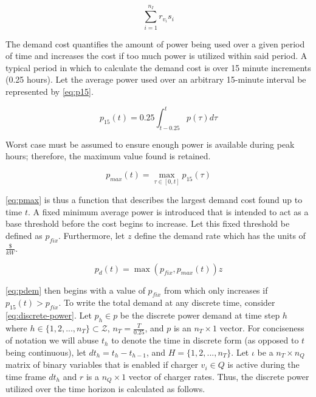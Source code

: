 \documentclass[11pt,a4paper,final]{article}
\newcommand{\Qset}{Q}                       %
\newcommand{\Hset}{H}                       %
\begin{document}
\begin{equation}
\label{eq:consumption-cost}
  \sum_{i=1}^{n_I} r_{v_i}s_i
\end{equation}

The demand cost quantifies the amount of power being used over a given period of time and increases the cost if too much
power is utilized within said period. A typical period in which to calculate the demand cost is over 15 minute
increments (0.25 hours). Let the average power used over an arbitrary 15-minute interval be represented by \ref{eq:p15}.

\begin{equation}
\label{eq:p15}
p_{15}(t) = 0.25 \int_{t-0.25}^{t} p(\tau) d\tau
\end{equation}

Worst case must be assumed to ensure enough power is available during peak hours; therefore, the maximum value found is
retained.

\begin{equation}
\label{eq:pmax}
p_{max}(t) = \max\limits_{\tau \in [0,t]}p_{15}(\tau)
\end{equation}

\ref{eq:pmax} is thus a function that describes the largest demand cost found up to time \(t\). A fixed minimum average power is
introduced that is intended to act as a base threshold before the cost begins to increase. Let this fixed threshold be
defined as \(p_{fix}\). Furthermore, let \(z\) define the demand rate which has the units of \(\frac{\$}{kW}\).

\begin{equation}
\label{eq:pdem}
p_d(t) = \max(p_{fix},p_{max}(t))z
\end{equation}

\ref{eq:pdem} then begins with a value of \(p_{fix}\) from which only increases if \(p_{15}(t) > p_{fix}\). To write the total
demand at any discrete time, consider \ref{eq:discrete-power}. Let \(p_h \in p\) be the discrete power demand at time step \(h\)
where \(h \in \{ 1, 2, ..., n_T \} \subset \mathcal{Z}\), \(n_T = \frac{T}{0.25}\), and \(p\) is an \(n_T \times 1\) vector. For conciseness of
notation we will abuse \(t_h\) to denote the time in discrete form (as opposed to \(t\) being continuous), let \(dt_h = t_h -
t_{h-1}\), and \(\Hset = \{ 1, 2, ..., n_T \}\). Let \(\iota\) be a \(n_T \times n_Q\) matrix of binary variables that is enabled if
charger \(v_i \in \Qset\) is active during the time frame \(dt_h\) and \(r\) is a \(n_Q \times 1\) vector of charger rates. Thus, the
discrete power utilized over the time horizon is calculated as follows.
\end{document}

